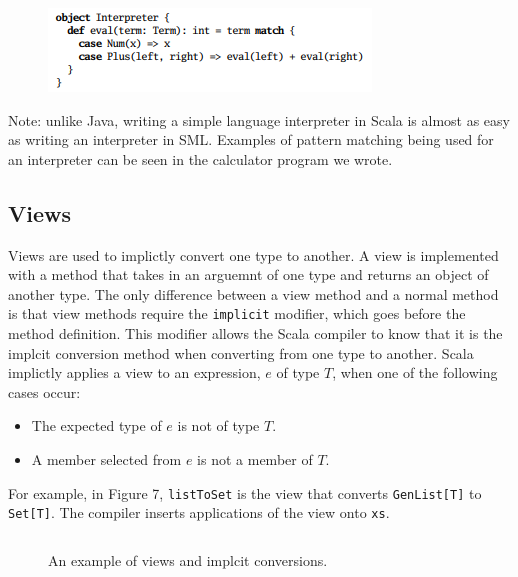 \documentclass[jou,apacite]{IEEEtran}
\begin{document}
  \begin{figure}[h]
    \centering
    \includegraphics[width=\columnwidth]{pattern_match}
    \caption{}
    \label{fig:example}
  \end{figure}
Note: unlike Java, writing a simple language interpreter in Scala is almost as easy as writing an interpreter in SML. Examples of pattern matching being used for an interpreter can be seen in the calculator program we wrote.

\subsection{Views}
Views are used to implictly convert one type to another. A view is implemented with a method that takes in an arguemnt of one type and returns an object of another type. The only difference between a view method and a normal method is that view methods require the \texttt{implicit} modifier, which goes before the method definition. This modifier allows the Scala compiler to know that it is the implcit conversion method when converting from one type to another. Scala implictly applies a view to an expression, $e$ of type $T$, when one of the following cases occur:
\begin{itemize}
    \item The expected type of $e$ is not of type $T$.
    \item A member selected from $e$ is not a member of $T$.
\end{itemize}  
For example, in Figure 7, \texttt{listToSet} is the view that converts \texttt{GenList[T]} to \texttt{Set[T]}. The compiler inserts applications of the view onto \texttt{xs}.
\begin{figure}
  
  \inputminted{Scala}{examples/Set.scala}
  \caption{An example of views and implcit conversions.}
  \label{lst:nats-example}
\end{figure}


\end{document}
